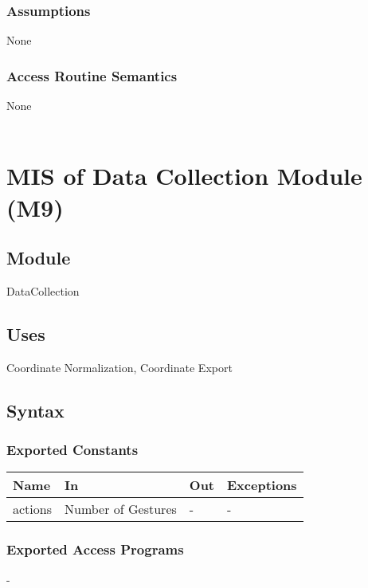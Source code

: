 \documentclass[12pt, titlepage]{article}
\begin{document}
\subsubsection{Assumptions}

None\\

\subsubsection{Access Routine Semantics}

None\\

~\newpage

\section{MIS of Data Collection Module (M9)} \label{M9}

\subsection{Module}

DataCollection\\

\subsection{Uses}

Coordinate Normalization, Coordinate Export\\

\subsection{Syntax}

\subsubsection{Exported Constants}

\begin{center}
\begin{tabular}{p{5cm} p{3cm} p{3cm} p{4cm}}
\hline
\textbf{Name} & \textbf{In} & \textbf{Out} & \textbf{Exceptions} \\
\hline
actions & Number of Gestures & - & - \\
\hline
\end{tabular}
\end{center}

\subsubsection{Exported Access Programs}
-
\end{document}
